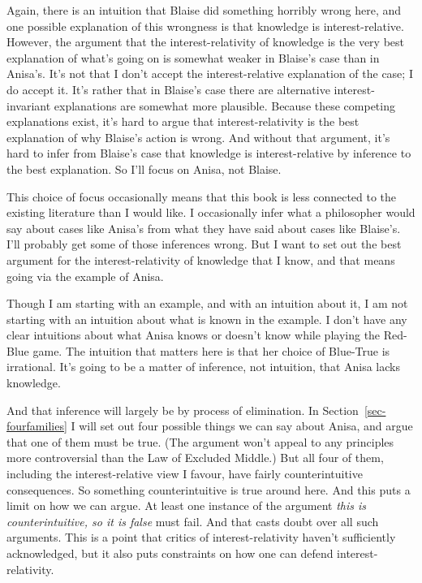 \documentclass[
  12pt,
  letterpaper,
]{scrbook}
\begin{document}
Again, there is an intuition that Blaise did something horribly wrong
here, and one possible explanation of this wrongness is that knowledge
is interest-relative. However, the argument that the interest-relativity
of knowledge is the very best explanation of what's going on is somewhat
weaker in Blaise's case than in Anisa's. It's not that I don't accept
the interest-relative explanation of the case; I do accept it. It's
rather that in Blaise's case there are alternative interest-invariant
explanations are somewhat more plausible. Because these competing
explanations exist, it's hard to argue that interest-relativity is the
best explanation of why Blaise's action is wrong. And without that
argument, it's hard to infer from Blaise's case that knowledge is
interest-relative by inference to the best explanation. So I'll focus on
Anisa, not Blaise.

This choice of focus occasionally means that this book is less connected
to the existing literature than I would like. I occasionally infer what
a philosopher would say about cases like Anisa's from what they have
said about cases like Blaise's. I'll probably get some of those
inferences wrong. But I want to set out the best argument for the
interest-relativity of knowledge that I know, and that means going via
the example of Anisa.

Though I am starting with an example, and with an intuition about it, I
am not starting with an intuition about what is known in the example. I
don't have any clear intuitions about what Anisa knows or doesn't know
while playing the Red-Blue game. The intuition that matters here is that
her choice of Blue-True is irrational. It's going to be a matter of
inference, not intuition, that Anisa lacks knowledge.

And that inference will largely be by process of elimination. In
Section~\ref{sec-fourfamilies} I will set out four possible things we
can say about Anisa, and argue that one of them must be true. (The
argument won't appeal to any principles more controversial than the Law
of Excluded Middle.) But all four of them, including the
interest-relative view I favour, have fairly counterintuitive
consequences. So something counterintuitive is true around here. And
this puts a limit on how we can argue. At least one instance of the
argument \emph{this is counterintuitive, so it is false} must fail. And
that casts doubt over all such arguments. This is a point that critics
of interest-relativity haven't sufficiently acknowledged, but it also
puts constraints on how one can defend interest-relativity.
\end{document}
